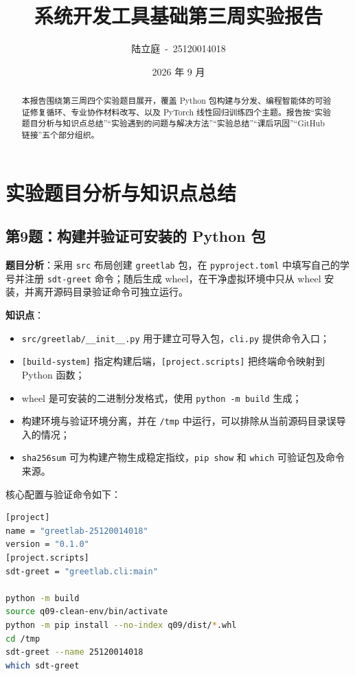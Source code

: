 \documentclass[a4paper, 12pt]{article}
\title{\textbf{\color{primary}系统开发工具基础\quad 第三周实验报告}}
\author{陆立庭\ -\ 25120014018}
\date{2026 年 9 月}
\begin{document}
\maketitle
\vspace{-0.5em}
\noindent{\color{primary}\rule{\textwidth}{1pt}}

\begin{abstract}
本报告围绕第三周四个实验题目展开，覆盖 Python 包构建与分发、编程智能体的可验证修复循环、专业协作材料改写、以及 PyTorch 线性回归训练四个主题。报告按“实验题目分析与知识点总结”“实验遇到的问题与解决方法”“实验总结”“课后巩固”“GitHub 链接”五个部分组织。
\end{abstract}

\tableofcontents
\newpage

\section{实验题目分析与知识点总结}

\subsection{第9题：构建并验证可安装的 Python 包}

\textbf{题目分析}：采用 \texttt{src} 布局创建 \texttt{greetlab} 包，在 \texttt{pyproject.toml} 中填写自己的学号并注册 \texttt{sdt-greet} 命令；随后生成 wheel，在干净虚拟环境中只从 wheel 安装，并离开源码目录验证命令可独立运行。

\textbf{知识点}：
\begin{itemize}
  \item \texttt{src/greetlab/\_\_init\_\_.py} 用于建立可导入包，\texttt{cli.py} 提供命令入口；
  \item \texttt{[build-system]} 指定构建后端，\texttt{[project.scripts]} 把终端命令映射到 Python 函数；
  \item wheel 是可安装的二进制分发格式，使用 \texttt{python -m build} 生成；
  \item 构建环境与验证环境分离，并在 \texttt{/tmp} 中运行，可以排除从当前源码目录误导入的情况；
  \item \texttt{sha256sum} 可为构建产物生成稳定指纹，\texttt{pip show} 和 \texttt{which} 可验证包及命令来源。
\end{itemize}

核心配置与验证命令如下：

\begin{lstlisting}[language=bash]
[project]
name = "greetlab-25120014018"
version = "0.1.0"
[project.scripts]
sdt-greet = "greetlab.cli:main"

python -m build
source q09-clean-env/bin/activate
python -m pip install --no-index q09/dist/*.whl
cd /tmp
sdt-greet --name 25120014018
which sdt-greet
\end{lstlisting}
\end{document}
